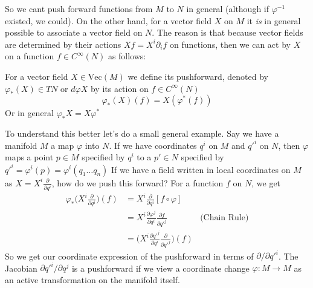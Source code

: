 \documentclass[../master.tex]{subfiles}
\begin{document}
		So we cant push forward functions from $M$ to $N$ in general (although if $\varphi^{-1}$ existed, we could). On the other hand, for a vector field $X$ on $M$ it \emph{is} in general possible to associate a vector field on $N$. The reason is that because vector fields are determined by their actions $Xf = X^i \partial_i f$ on functions, then we can act by $X$ on a function $f \in C^{\infty} (N)$ as follows:
		\begin{defn}
			For a vector field $X \in \text{Vec}(M)$ we define its pushforward, denoted by $\varphi_*(X) \in TN$ or $d\varphi X$ by its action on $f \in C^\infty(N)$
			\begin{equation*}
				\varphi_*(X)(f) = X (\varphi^*(f))
			\end{equation*}
			Or in general $\varphi_* X= X \varphi^*$
		\end{defn}
		To understand this better let's do a small general example.
		Say we have a manifold $M$ a map $\varphi$ into $N$. If we have coordinates $q^i$ on $M$ and $q'^i$ on $N$, then $\varphi$ maps a point $p \in M$ specified by $q^i$ to a $p'\in N$ specified by $q'^i = \varphi^i (p) = \varphi^i(q_1 \dots q_n)$
		 If we have a field written in local coordinates on $M$ as $X=X^i \frac{\partial}{\partial q^i}$, how do we push this forward? For a function $f$ on $N$, we get
		\begin{align*}
			\varphi_* \Big(X^i \frac{\partial}{\partial q^i}\Big)(f) &= X^i \frac{\partial}{\partial q^i} [f\circ \varphi] &\\
			&= X^i \frac{\partial \varphi^j}{\partial q^i} \frac{\partial f}{\partial q'^j} & \text{(Chain Rule)}\\
			&= \Big(X^i \frac{\partial q'^j}{\partial q^i} \frac{\partial}{\partial q'^j}\Big)(f)
		\end{align*}
		So we get our coordinate expression of the pushforward in terms of $\partial/\partial q'^i$. The Jacobian $\partial q'^i/\partial q^j$ is a pushforward if we view a coordinate change $\varphi:M \rightarrow M$ as an active transformation on the  manifold itself. 
			
\end{document}
